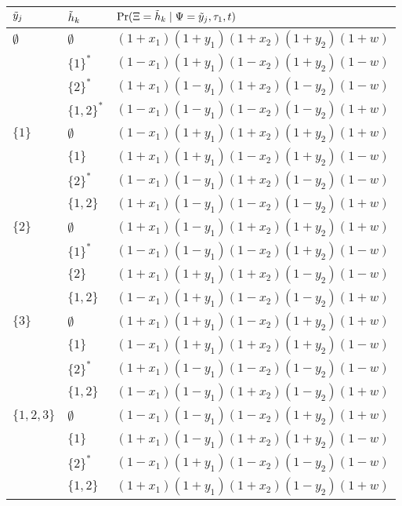 \begin{table}
\centering
\begin{tabular}{|l|ll|}
\hline
$\tilde{y}_j$ & $\tilde{h}_k$ & $\Pr(\Xi=\tilde{h}_k \mid \Psi=\tilde{y}_j, \tau_1, t)$\\
\hline
$\emptyset$&$\emptyset$&$(1+x_1)(1+y_1)(1+x_2)(1+y_2)(1+w)$\\
&$\{1\}^*$&$(1-x_1)(1+y_1)(1-x_2)(1+y_2)(1-w)$             \\
&$\{2\}^*$&$(1+x_1)(1-y_1)(1+x_2)(1-y_2)(1-w)$             \\
&$\{1,2\}^*$&$(1-x_1)(1-y_1)(1-x_2)(1-y_2)(1+w)$           \\
                                                           
$\{1\}$    &$\emptyset$&$(1-x_1)(1+y_1)(1+x_2)(1+y_2)(1+w)$\\
&$\{1\}$&$(1+x_1)(1+y_1)(1-x_2)(1+y_2)(1-w)$               \\
&$\{2\}^*$&$(1-x_1)(1-y_1)(1+x_2)(1-y_2)(1-w)$             \\
&$\{1,2\}$&$(1+x_1)(1-y_1)(1-x_2)(1-y_2)(1+w)$             \\
                                                           
$\{2\}$    &$\emptyset$&$(1+x_1)(1-y_1)(1+x_2)(1+y_2)(1+w)$\\
&$\{1\}^*$&$(1-x_1)(1-y_1)(1-x_2)(1+y_2)(1-w)$             \\
&$\{2\}$&$(1+x_1)(1+y_1)(1+x_2)(1-y_2)(1-w)$               \\
&$\{1,2\}$&$(1-x_1)(1+y_1)(1-x_2)(1-y_2)(1+w)$             \\
                                                           
$\{3\}$    &$\emptyset$&$(1+x_1)(1+y_1)(1-x_2)(1+y_2)(1+w)$\\
&$\{1\}$&$(1-x_1)(1+y_1)(1+x_2)(1+y_2)(1-w)$               \\
&$\{2\}^*$&$(1+x_1)(1-y_1)(1-x_2)(1-y_2)(1-w)$             \\
&$\{1,2\}$&$(1-x_1)(1-y_1)(1+x_2)(1-y_2)(1+w)$             \\
                                                           
$\{1,2,3\}$&$\emptyset$&$(1-x_1)(1-y_1)(1-x_2)(1+y_2)(1+w)$\\
&$\{1\}$&$(1+x_1)(1-y_1)(1+x_2)(1+y_2)(1-w)$               \\
&$\{2\}^*$&$(1-x_1)(1+y_1)(1-x_2)(1-y_2)(1-w)$             \\
&$\{1,2\}$&$(1+x_1)(1+y_1)(1+x_2)(1-y_2)(1+w)$             \\
                                                           

\end{tabular}
\end{table}
